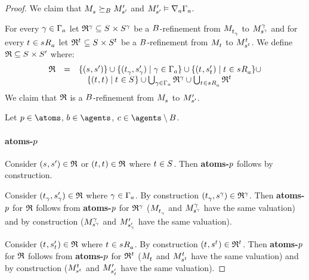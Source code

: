 \begin{proof}
We claim that $\kPModel{\kStateS} \simulatesBs \kPModelP{\kStateSP}$ and $\kPModelP{\kStateSP} \entails \coversA \Gamma_\agentA$.

For every $\gamma \in \Gamma_\agentA$ let $\refinement^\gamma \subseteq \kStates \times \kStates[\gamma]$ be a $\agentsB$-refinement from $\kPModel{\kStateT_\gamma}$ to $\kPModel[\gamma]{\kStateS[\gamma]}$ and
for every $\kStateT \in \kSuccessorsA{\kStateS}$ let $\refinement^{\kStateT} \subseteq \kStates \times \kStates[\kStateT]$ be a $\agentsB$-refinement from $\kPModel{\kStateT}$ to $\kPModel[\kStateT]{\kStateS[\kStateT]}$.
We define $\refinement \subseteq \kStates \times \kStatesP$ where:
$$
\begin{array}{rcl}
    \refinement &=& \{(\kStateS, \kStateSP)\} \cup \{(\kStateT_\gamma, \kStateSP_\gamma) \mid \gamma \in \Gamma_\agentA\} \cup \{(\kStateT, \kStateSP_{\kStateT}) \mid \kStateT \in \kSuccessorsA{\kStateS}\} \cup \\&&\quad \{(\kStateT, \kStateT) \mid \kStateT \in \kStates\} \cup \bigcup_{\gamma \in \Gamma_\agentA} \refinement^\gamma \cup \bigcup_{\kStateT \in \kSuccessorsA{\kStateS}} \refinement^{\kStateT}
\end{array}
$$
We claim that $\refinement$ is a $\agentsB$-refinement from $\kPModel{\kStateS}$ to $\kPModelP{\kStateSP}$.

Let $\atomP \in \atoms$, $\agentB \in \agents$, $\agentC \in \agents \setminus \agentsB$.

\paragraph{atoms-$\atomP$}
Consider $(\kStateS, \kStateSP) \in \refinement$ or $(\kStateT, \kStateT) \in \refinement$ where $\kStateT \in \kStates$.
Then {\bf atoms-$\atomP$} follows by construction.

Consider $(\kStateT_\gamma, \kStateSP_\gamma) \in \refinement$ where $\gamma \in \Gamma_\agentA$.
By construction $(\kStateT_\gamma, \kStateS[\gamma]) \in \refinement^\gamma$.
Then {\bf atoms-$\atomP$} for $\refinement$ follows from {\bf atoms-$\atomP$} for $\refinement^\gamma$ ($\kPModel{\kStateT_\gamma}$ and $\kPModel[\gamma]{\kStateS[\gamma]}$ have the same valuation) and by construction ($\kPModel[\gamma]{\kStateS[\gamma]}$ and $\kPModelP{\kStateSP_\gamma}$ have the same valuation).

Consider $(\kStateT, \kStateSP_{\kStateT}) \in \refinement$ where $\kStateT \in \kSuccessorsA{\kStateS}$.
By construction $(\kStateT, \kStateS[\kStateT]) \in \refinement^{\kStateT}$.
Then {\bf atoms-$\atomP$} for $\refinement$ follows from {\bf atoms-$\atomP$} for $\refinement^{\kStateT}$ ($\kPModel{\kStateT}$ and $\kPModel[\kStateT]{\kStateS[\kStateT]}$ have the same valuation) and by construction ($\kPModel[\kStateT]{\kStateS[\kStateT]}$ and $\kPModelP{\kStateSP_{\kStateT}}$ have the same valuation).


\end{proof}
